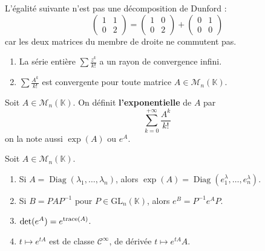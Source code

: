   \begin{cexample}
    L'égalité suivante n'est pas une décomposition de Dunford :
    \[ \begin{pmatrix} 1 & 1 \\ 0 & 2 \end{pmatrix} = \begin{pmatrix} 1 & 0 \\ 0 & 2 \end{pmatrix} + \begin{pmatrix} 0 & 1 \\ 0 & 0 \end{pmatrix} \]
    car les deux matrices du membre de droite ne commutent pas.
  \end{cexample}


  \begin{lemma}
    \begin{enumerate}[label=(\roman*)]
      \item La série entière $\sum \frac{z^k}{k!}$ a un rayon de convergence infini.
      \item $\sum \frac{A^k}{k!}$ est convergente pour toute matrice $A \in \mathcal{M}_n(\mathbb{K})$.
    \end{enumerate}
  \end{lemma}

  \begin{definition}
    Soit $A \in \mathcal{M}_n(\mathbb{K})$. On définit \textbf{l'exponentielle} de $A$ par
    \[ \sum_{k=0}^{+\infty} \frac{A^k}{k!} \]
    on la note aussi $\exp(A)$ ou $e^A$.
  \end{definition}

  \begin{theorem}
    Soit $A \in \mathcal{M}_n(\mathbb{K})$.
    \begin{enumerate}[label=(\roman*)]
      \item Si $A = \operatorname{Diag}(\lambda_1, \dots, \lambda_n)$, alors $\exp(A) = \operatorname{Diag}(e^\lambda_1, \dots, e^\lambda_n)$.
      \item Si $B = PAP^{-1}$ pour $P \in \mathrm{GL}_n(\mathbb{K})$, alors $e^B = P^{-1} e^A P$.
      \item $\det(e^A) = e^{\operatorname{trace}(A)}$.
      \item $t \mapsto e^{tA}$ est de classe $\mathcal{C}^\infty$, de dérivée $t \mapsto e^{tA}A$.
    \end{enumerate}
  \end{theorem}

